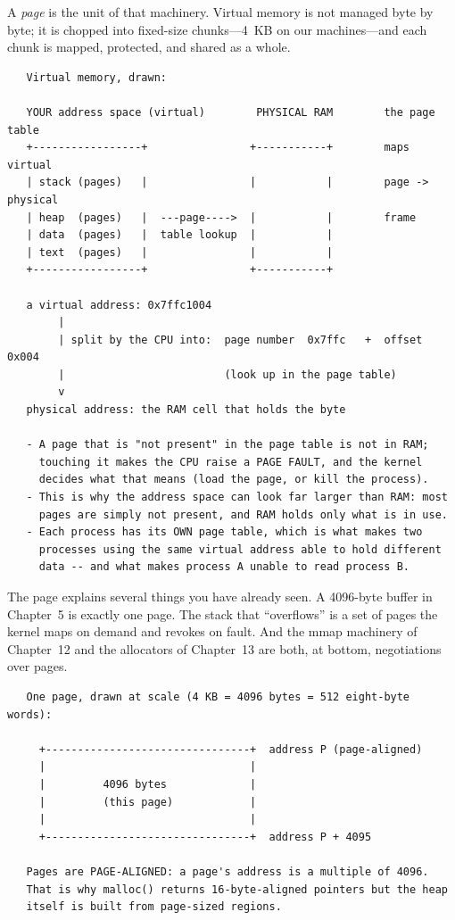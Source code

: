 A \emph{page} is the unit of that machinery. Virtual memory is not
managed byte by byte; it is chopped into fixed-size chunks---4~KB on
our machines---and each chunk is mapped, protected, and shared as a
whole.

\begin{verbatim}
   Virtual memory, drawn:

   YOUR address space (virtual)        PHYSICAL RAM        the page table
   +-----------------+                +-----------+        maps virtual
   | stack (pages)   |                |           |        page -> physical
   | heap  (pages)   |  ---page---->  |           |        frame
   | data  (pages)   |  table lookup  |           |
   | text  (pages)   |                |           |
   +-----------------+                +-----------+

   a virtual address: 0x7ffc1004
        |
        | split by the CPU into:  page number  0x7ffc   +  offset 0x004
        |                         (look up in the page table)
        v
   physical address: the RAM cell that holds the byte

   - A page that is "not present" in the page table is not in RAM;
     touching it makes the CPU raise a PAGE FAULT, and the kernel
     decides what that means (load the page, or kill the process).
   - This is why the address space can look far larger than RAM: most
     pages are simply not present, and RAM holds only what is in use.
   - Each process has its OWN page table, which is what makes two
     processes using the same virtual address able to hold different
     data -- and what makes process A unable to read process B.
\end{verbatim}

The page explains several things you have already seen. A 4096-byte
buffer in Chapter~5 is exactly one page. The stack that ``overflows''
is a set of pages the kernel maps on demand and revokes on fault. And
the mmap machinery of Chapter~12 and the allocators of Chapter~13 are
both, at bottom, negotiations over pages.

\begin{verbatim}
   One page, drawn at scale (4 KB = 4096 bytes = 512 eight-byte words):

     +--------------------------------+  address P (page-aligned)
     |                                |
     |         4096 bytes             |
     |         (this page)            |
     |                                |
     +--------------------------------+  address P + 4095

   Pages are PAGE-ALIGNED: a page's address is a multiple of 4096.
   That is why malloc() returns 16-byte-aligned pointers but the heap
   itself is built from page-sized regions.
\end{verbatim}

